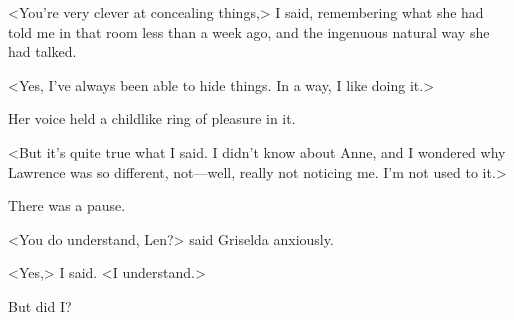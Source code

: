 <You're very clever at concealing things,> I said, remembering what she had told me in that room less than a week ago, and the ingenuous natural way she had talked.

<Yes, I've always been able to hide things. In a way, I like doing it.>

Her voice held a childlike ring of pleasure in it.

<But it's quite true what I said. I didn't know about Anne, and I wondered why Lawrence was so different, not—well, really not noticing me. I'm not used to it.>

There was a pause.

<You do understand, Len?> said Griselda anxiously.

<Yes,> I said. <I understand.>

But did I?